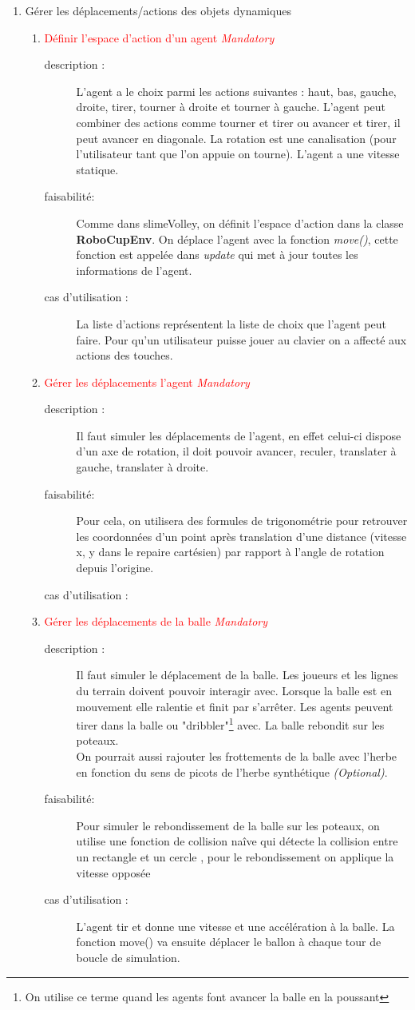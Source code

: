 \documentclass[11pt, a4paper]{article}
\newcommand{\besoinVItem}[4]{
	\item #1
	\begin{description}
		\item[description :]
		#2
		\item[faisabilité: ]
		#3
		\item[cas d'utilisation :]
		#4
	\end{description}
}
\begin{document}
\begin{enumerate}
\begin{enumerate}
		\end{enumerate}

		\item Gérer les déplacements/actions des objets dynamiques

		\begin{enumerate}
			\besoinVItem{\textcolor{red}{Définir l'espace d'action d'un agent \textit{Mandatory}}}
			{L'agent a le choix parmi les actions suivantes : haut, bas, gauche, droite, tirer, tourner à droite et tourner à gauche. L'agent peut combiner des actions comme tourner et tirer ou avancer et tirer, il peut avancer en diagonale. La rotation est une canalisation (pour l'utilisateur tant que l'on appuie on tourne). L'agent a une vitesse statique. }
			{Comme dans slimeVolley, on définit l'espace d'action dans la classe \textbf{RoboCupEnv}. On déplace l'agent avec la fonction \textit{move()}, cette fonction est appelée dans  \textit{update} qui met à jour toutes les informations de l'agent. }
			{La liste d'actions représentent la liste de choix que l'agent peut faire. Pour qu'un utilisateur puisse jouer au clavier on a affecté aux actions des touches. }

			\besoinVItem{\textcolor{red}{Gérer les déplacements l'agent \textit{Mandatory}}}
			{
				Il faut simuler les déplacements de l'agent, en effet celui-ci dispose d'un axe de rotation, il doit pouvoir avancer, reculer, translater à gauche, translater à droite.	\\

			}
			{Pour cela, on utilisera des formules de trigonométrie \cite{trigonometry2} pour retrouver les coordonnées d'un point après translation d'une distance (vitesse x, y dans le repaire cartésien) par rapport à l'angle de rotation depuis l'origine.}
			{}


			\besoinVItem{\textcolor{red}{Gérer les déplacements de la balle \textit{Mandatory}}}
			{
				Il faut simuler le déplacement de la balle. Les joueurs et les lignes du terrain doivent pouvoir interagir avec. Lorsque la balle est en mouvement elle ralentie et finit par s'arrêter. Les agents peuvent tirer dans la balle ou "dribbler"\footnote{On utilise ce terme quand les agents font avancer la balle en la poussant } avec. La balle rebondit sur les poteaux.	\\
				On pourrait aussi rajouter les frottements de la balle avec l'herbe en fonction du sens de picots de l'herbe synthétique \textit{(Optional)}.
			}
			{Pour simuler le rebondissement de la balle sur les poteaux, on utilise une fonction de collision naîve qui détecte la collision entre un rectangle et un cercle \cite{collision1} , pour le rebondissement on applique la vitesse opposée}
			{L'agent tir et donne une vitesse et une accélération à la balle. La fonction move() va ensuite déplacer le ballon à chaque tour de boucle de simulation.}


\end{enumerate}
\end{enumerate}
\end{document}
